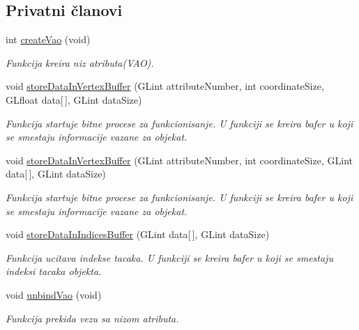 \subsection*{Privatni članovi}
\begin{DoxyCompactItemize}
\item 
int \hyperlink{classcore_1_1VaoLoader_af76598a15d38378e594778d9a63a7a6a}{create\+Vao} (void)
\begin{DoxyCompactList}\small\item\em Funkcija kreira niz atributa(\+V\+A\+O). \end{DoxyCompactList}\item 
void \hyperlink{classcore_1_1VaoLoader_a234b87947a46ffcaea7dc6de09185a41}{store\+Data\+In\+Vertex\+Buffer} (G\+Lint attribute\+Number, int coordinate\+Size, G\+Lfloat data\mbox{[}$\,$\mbox{]}, G\+Lint data\+Size)
\begin{DoxyCompactList}\small\item\em Funkcija startuje bitne procese za funkcionisanje. U funkciji se kreira bafer u koji se smestaju informacije vazane za objekat. \end{DoxyCompactList}\item 
void \hyperlink{classcore_1_1VaoLoader_a4e9c5aee112aa6194ea776bc7eeaf98f}{store\+Data\+In\+Vertex\+Buffer} (G\+Lint attribute\+Number, int coordinate\+Size, G\+Lint data\mbox{[}$\,$\mbox{]}, G\+Lint data\+Size)
\begin{DoxyCompactList}\small\item\em Funkcija startuje bitne procese za funkcionisanje. U funkciji se kreira bafer u koji se smestaju informacije vazane za objekat. \end{DoxyCompactList}\item 
void \hyperlink{classcore_1_1VaoLoader_a7195d251490976b2053548e19b7c6f1d}{store\+Data\+In\+Indices\+Buffer} (G\+Lint data\mbox{[}$\,$\mbox{]}, G\+Lint data\+Size)
\begin{DoxyCompactList}\small\item\em Funkcija ucitava indekse tacaka. U funkciji se kreira bafer u koji se smestaju indeksi tacaka objekta. \end{DoxyCompactList}\item 
void \hyperlink{classcore_1_1VaoLoader_a8876e8e71b0299c47406afc7a2cb6d81}{unbind\+Vao} (void)
\begin{DoxyCompactList}\small\item\em Funkcija prekida vezu sa nizom atributa. \end{DoxyCompactList}\item 

\end{DoxyCompactItemize}
